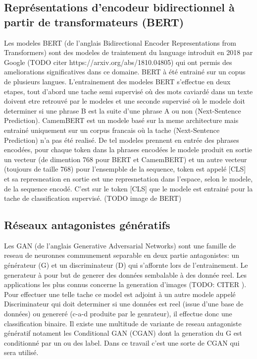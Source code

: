 \documentclass[francais,a4paper]{llncs} %
\begin{document}
	\subsection{Représentations d'encodeur bidirectionnel à partir de transformateurs (BERT)}
	Les modeles BERT (de l'anglais Bidirectional Encoder Representations from Transformers) sont des modeles de traintement du language introduit en 2018 par Google (TODO citer https://arxiv.org/abs/1810.04805) qui ont permis des ameliorations significatives dans ce domaine. BERT à été entrainé sur un copus de plusieurs langues. L'entrainement des modeles BERT s'effectue en deux etapes, tout d'abord une tache semi supervisé où des mots caviardé dans un texte doivent etre retrouvé par le modeles et une seconde supervisé où le modele doit determiner si une phrase B est la suite d'une phrase A ou non (Next-Sentence Prediction).
	CamemBERT est un modele basé sur la meme architecture mais entrainé uniquement sur un corpus francais où la tache (Next-Sentence Prediction) n'a pas été realisé.
	De tel modeles prennent en entrée des phrases encodées, pour chaque token dans la phrases encodées le modele produit en sortie un vecteur (de dimention 768 pour BERT et CamemBERT) et un autre vecteur (toujours de taille 768) pour l'ensempble de la sequence, token est appelé [CLS] et sa represneation en sortie est une represnetation dans l'espace, selon le modele, de la sequence encodé. C'est sur le token [CLS] que le modele est entrainé pour la tache de classification supervisé.
	(TODO image de BERT)
	
	\subsection{Réseaux antagonistes génératifs}
	Les GAN (de l'anglais Generative Adversarial Networks) sont une famille de reseau de neuronnes communement separable en deux partie antagonistes: un générateur (G) et un discriminateur (D) qui s'affornte lors de l'entrainement.
	Le generateur à pour but de generer des données sembalable à des donnée reel. Les applications les plus connus concerne la generation d'images (TODO: CITER ). Pour effectuer une telle tache ce model est adjoint à un autre modele appelé Discriminateur qui doit determiner si une données est reel (issue d'une base de données) ou genereré (c-a-d produite par le genrateur), il effectue donc une classification binaire.
	Il existe une multitude de variante de reseau antagoniste génératif notament les Conditional GAN (CGAN) dont la generation du G est conditionné par un ou des label.
	Dans ce travail c'est une sorte de CGAN qui sera utilisé.
\end{document}
